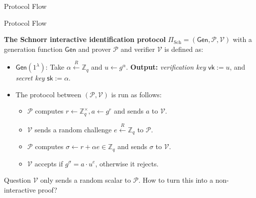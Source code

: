 \documentclass{zkdl-presentation-template}
\begin{document}
\begin{frame}{Protocol Flow}
\begin{figure}[H]
    
        \label{fig:interactive_schnorr}
        \end{figure}
    \end{frame}

    \begin{frame}{Protocol Flow}
        \begin{definition}
            \textbf{The Schnorr interactive identification protocol} $\Pi_{\text{Sch}} = (\mathsf{Gen}, \mathcal{P}, \mathcal{V})$ with a generation function $\mathsf{Gen}$ and prover $\mathcal{P}$ and verifier $\mathcal{V}$ is defined as:
            \begin{itemize}
                \item $\mathsf{Gen}(1^{\lambda})$: Take $\alpha \xleftarrow{R} \mathbb{Z}_q$ and $u \gets g^{\alpha}$. \textbf{Output:} \textit{verification key} $\mathsf{vk} := u$, and \textit{secret key} $\mathsf{sk} := \alpha$.
                \item The protocol between $(\mathcal{P},\mathcal{V})$ is run as follows:
                \begin{itemize}
                    \item $\mathcal{P}$ computes $r \gets \mathbb{Z}_q^{\times}, a \gets g^{r}$ and sends $a$ to $\mathcal{V}$.
                    \item $\mathcal{V}$ sends a random challenge $e \xleftarrow{R} \mathbb{Z}_q$ to $\mathcal{P}$.
                    \item $\mathcal{P}$ computes $\sigma \gets r + \alpha e \in \mathbb{Z}_q$ and sends $\sigma$ to $\mathcal{V}$.
                    \item $\mathcal{V}$ accepts if $g^{\sigma} = a \cdot u^e$, otherwise it rejects.
                \end{itemize}
            \end{itemize}
        \end{definition}

        \begin{alertblock}{Question}
            $\mathcal{V}$ only sends a random scalar to $\mathcal{P}$. How to turn this into a non-interactive proof?
        \end{alertblock}
    \end{frame}
\end{document}
